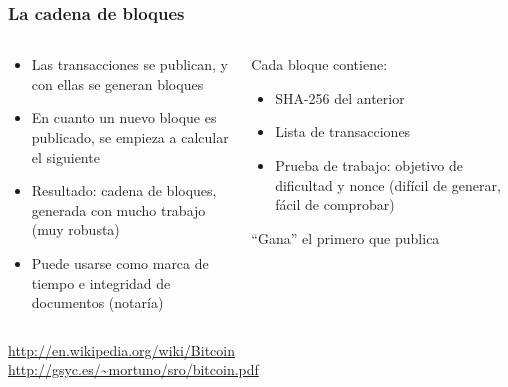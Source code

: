 \begin{frame}
\frametitle{La cadena de bloques}

{\large
\begin{columns}[T]
\begin{column}{.56\textwidth}
\begin{itemize}
\item Las transacciones se publican, y con ellas se generan bloques
\item En cuanto un nuevo bloque es publicado, se empieza a calcular el siguiente
\item Resultado: cadena de bloques, generada con mucho trabajo (muy robusta)
\item Puede usarse como marca de tiempo e integridad de documentos (notaría)
\end{itemize}
\end{column}%
\hfill%
\begin{column}{.40\textwidth}

Cada bloque contiene:
\begin{itemize}
\item SHA-256 del anterior
\item Lista de transacciones
\item Prueba de trabajo: objetivo de dificultad y nonce (difícil de generar, fácil de comprobar)
\end{itemize}

``Gana'' el primero que publica
\end{column}%
\end{columns}
}

\begin{flushright}
\url{http://en.wikipedia.org/wiki/Bitcoin} \\
\url{http://gsyc.es/~mortuno/sro/bitcoin.pdf} \\
\end{flushright}

\end{frame}





